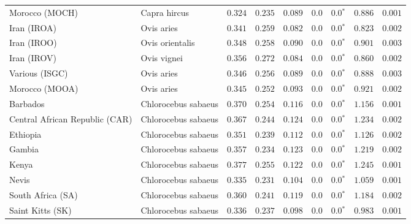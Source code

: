 \begin{center}
\begin{adjustbox}{width = 1\textwidth}
\begin{tabular}{|l|l|r|r|r|r|r|r|r|}
            Morocco (MOCH)                    & Capra hircus     & $ 0.324$ & $ 0.235$ & $ 0.089$ & $0.0$ & $\bm{0.0{^*}}$ & $ 0.886$ & $ 0.001$ \\
            Iran (IROA)                    & Ovis aries         & $ 0.341$ & $ 0.259$ & $ 0.082$ & $0.0$ & $\bm{0.0{^*}}$ & $ 0.823$ & $ 0.002$ \\
            Iran (IROO)                 & Ovis orientalis          & $ 0.348$ & $ 0.258$ & $ 0.090$ & $0.0$ & $\bm{0.0{^*}}$ & $ 0.901$ & $ 0.003$ \\
            Iran (IROV)                 & Ovis vignei          & $ 0.356$ & $ 0.272$ & $ 0.084$ & $0.0$ & $\bm{0.0{^*}}$ & $ 0.860$ & $ 0.002$ \\
            Various (ISGC)                       & Ovis aries & $ 0.346$ & $ 0.256$ & $ 0.089$ & $0.0$ & $\bm{0.0{^*}}$ & $ 0.888$ & $ 0.003$ \\
            Morocco (MOOA) & Ovis aries & $ 0.345$ & $ 0.252$ & $ 0.093$ & $0.0$ & $\bm{0.0{^*}}$ & $ 0.921$ & $ 0.002$ \\
            Barbados                       & Chlorocebus sabaeus & $ 0.370$ & $ 0.254$ & $ 0.116$ & $0.0$ & $\bm{0.0{^*}}$ & $ 1.156$ & $ 0.001$ \\
            Central African Republic (CAR)                         & Chlorocebus sabaeus & $ 0.367$ & $ 0.244$ & $ 0.124$ & $0.0$ & $\bm{0.0{^*}}$ & $ 1.234$ & $ 0.002$ \\
            Ethiopia                          & Chlorocebus sabaeus & $ 0.351$ & $ 0.239$ & $ 0.112$ & $0.0$ & $\bm{0.0{^*}}$ & $ 1.126$ & $ 0.002$ \\
            Gambia                          & Chlorocebus sabaeus & $ 0.357$ & $ 0.234$ & $ 0.123$ & $0.0$ & $\bm{0.0{^*}}$ & $ 1.219$ & $ 0.002$ \\
            Kenya              & Chlorocebus sabaeus & $ 0.377$ & $ 0.255$ & $ 0.122$ & $0.0$ & $\bm{0.0{^*}}$ & $ 1.245$ & $ 0.001$ \\
            Nevis               & Chlorocebus sabaeus & $ 0.335$ & $ 0.231$ & $ 0.104$ & $0.0$ & $\bm{0.0{^*}}$ & $ 1.059$ & $ 0.001$ \\
            South Africa (SA)                         & Chlorocebus sabaeus & $ 0.360$ & $ 0.241$ & $ 0.119$ & $0.0$ & $\bm{0.0{^*}}$ & $ 1.184$ & $ 0.002$ \\
            Saint Kitts (SK)                  & Chlorocebus sabaeus        & $ 0.336$ & $ 0.237$ & $ 0.098$ & $0.0$ & $\bm{0.0{^*}}$ & $ 0.983$ & $ 0.001$ \\

\end{tabular}
\end{adjustbox}
\end{center}
